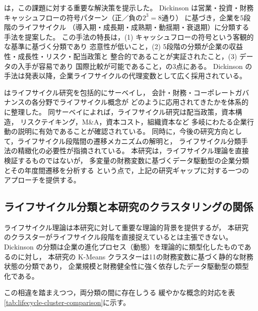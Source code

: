  は，この課題に対する重要な解決策を提示した。
Dickinson は営業・投資・財務キャッシュフローの符号パターン（正／負の$2^3 = 8$通り）
に基づき，企業を5段階のライフサイクル
（導入期・成長期・成熟期・動揺期・衰退期）に分類する手法を提案した。
この手法の特長は，(1) キャッシュフローの符号という客観的な基準に基づく分類であり
恣意性が低いこと，(2) 5段階の分類が企業の収益性・成長性・リスク・配当政策と
整合的であることが実証されたこと，(3) データの入手が容易であり
国際比較が可能であること，の3点にある。
Dickinson の手法は発表以降，企業ライフサイクルの代理変数として広く採用されている。

 はライフサイクル研究を包括的にサーベイし，
会計・財務・コーポレートガバナンスの各分野でライフサイクル概念が
どのように応用されてきたかを体系的に整理した。
同サーベイによれば，ライフサイクル研究は配当政策，資本構造，
リスクテイキング，M\&A，資本コスト，組織資本など
多岐にわたる企業行動の説明に有効であることが確認されている。
同時に，今後の研究方向として，ライフサイクル段階間の遷移メカニズムの解明と，
ライフサイクル分類手法の精緻化の必要性が指摘されている。
本研究は，ライフサイクル理論を直接検証するものではないが，
多変量の財務変数に基づくデータ駆動型の企業分類とその年度間遷移を分析する
という点で，上記の研究ギャップに対する一つのアプローチを提供する。

\subsection{ライフサイクル分類と本研究のクラスタリングの関係}

ライフサイクル理論は本研究に対して重要な理論的背景を提供するが，
本研究のクラスターがライフサイクル段階を直接捉えているとは主張できない。
Dickinson の分類は企業の進化プロセス（動態）を理論的に類型化したものであるのに対し，
本研究の K-Means クラスターは11の財務変数に基づく静的な財務状態の分類であり，
企業規模と財務健全性に強く依存したデータ駆動型の類型化である。

この相違を踏まえつつ，両分類の間に存在しうる
緩やかな概念的対応を表\ref{tab:lifecycle-cluster-comparison}に示す。

